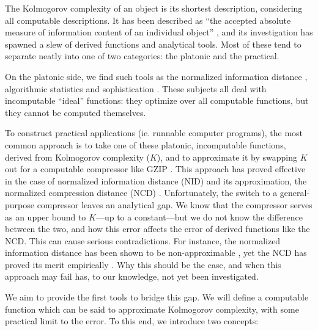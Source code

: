 The Kolmogorov complexity of an object is its shortest description, considering all computable descriptions. It has been described as ``the accepted absolute measure of information content of an individual object'' \cite{DBLP:journals/tit/GacsTV01}, and its investigation has spawned a slew of derived functions and analytical tools. Most of these tend to separate neatly into one of two categories: the platonic and the practical. 

On the platonic side, we find such tools as the normalized information distance \cite{DBLP:journals/tit/LiCLMV04}, algorithmic statistics \cite{DBLP:journals/tit/GacsTV01} and sophistication \cite{DBLP:journals/tit/Vitanyi06,adriaans2012facticity}. These subjects all deal with incomputable ``ideal'' functions: they optimize over all computable functions, but they cannot be computed themselves.


To construct practical applications (ie. runnable computer programs), the most common approach is to take one of these platonic, incomputable functions, derived from Kolmogorov complexity ($K$), and to approximate it by swapping $K$ out for a computable compressor like GZIP \cite{gailly1991gzip}. This approach has proved effective in the case of normalized information distance (NID) \cite{DBLP:journals/tit/LiCLMV04} and its approximation, the normalized compression distance (NCD) \cite{DBLP:journals/tit/CilibrasiV05}. Unfortunately, the switch to a general-purpose compressor leaves an analytical gap. We know that the compressor serves as an upper bound to $K$---up to a constant---but we do not know the difference between the two, and how this error affects the error of derived functions like the NCD. This can cause serious contradictions. For instance, the normalized information distance has been shown to be non-approximable \cite{DBLP:journals/jcss/TerwijnTV11}, yet the NCD has proved its merit empirically \cite{DBLP:journals/tit/CilibrasiV05}. Why this should be the case, and when this approach may fail has, to our knowledge, not yet been investigated.


We aim to provide the first tools to bridge this gap. We will define a computable function which can be said to approximate Kolmogorov complexity, with some practical limit to the error. To this end, we introduce two concepts:

